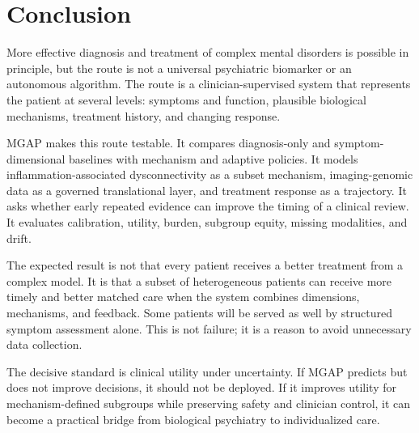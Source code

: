 \documentclass[conference]{IEEEtran}
\begin{document}
\section{Conclusion}
More effective diagnosis and treatment of complex mental disorders is possible in principle, but the route is not a universal psychiatric biomarker or an autonomous algorithm. The route is a clinician-supervised system that represents the patient at several levels: symptoms and function, plausible biological mechanisms, treatment history, and changing response.

MGAP makes this route testable. It compares diagnosis-only and symptom-dimensional baselines with mechanism and adaptive policies. It models inflammation-associated dysconnectivity as a subset mechanism, imaging-genomic data as a governed translational layer, and treatment response as a trajectory. It asks whether early repeated evidence can improve the timing of a clinical review. It evaluates calibration, utility, burden, subgroup equity, missing modalities, and drift.

The expected result is not that every patient receives a better treatment from a complex model. It is that a subset of heterogeneous patients can receive more timely and better matched care when the system combines dimensions, mechanisms, and feedback. Some patients will be served as well by structured symptom assessment alone. This is not failure; it is a reason to avoid unnecessary data collection.

The decisive standard is clinical utility under uncertainty. If MGAP predicts but does not improve decisions, it should not be deployed. If it improves utility for mechanism-defined subgroups while preserving safety and clinician control, it can become a practical bridge from biological psychiatry to individualized care.
\end{document}
